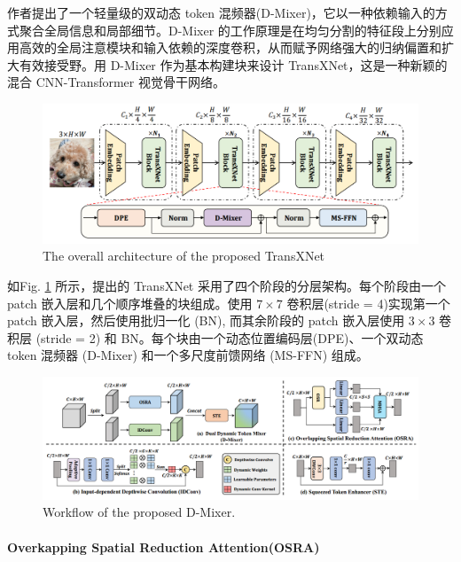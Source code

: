 \documentclass[a4paper]{ctexart}
\begin{document}
		作者提出了一个轻量级的双动态 token 混频器(D-Mixer)，它以一种依赖输入的方式聚合全局信息和局部细节。D-Mixer 的工作原理是在均匀分割的特征段上分别应用高效的全局注意模块和输入依赖的深度卷积，从而赋予网络强大的归纳偏置和扩大有效接受野。用 D-Mixer 作为基本构建块来设计 TransXNet，这是一种新颖的混合 CNN-Transformer 视觉骨干网络。
		
		\begin{figure}[htbp]
			\centering
			\includegraphics[width=\linewidth]{picture/LLIE/Experiment/the Proposed TransXNet}
			\caption{The overall architecture of the proposed TransXNet}
			\label{fig: TransXNet}
		\end{figure}
		
		如Fig. \ref{fig: TransXNet} 所示，提出的 TransXNet 采用了四个阶段的分层架构。每个阶段由一个 patch 嵌入层和几个顺序堆叠的块组成。使用 $7 \times 7$ 卷积层(stride = 4)实现第一个 patch 嵌入层，然后使用批归一化 (BN), 而其余阶段的 patch 嵌入层使用 $3 \times 3$ 卷积层 (stride = 2) 和 BN。每个块由一个动态位置编码层(DPE)、一个双动态 token 混频器 (D-Mixer) 和一个多尺度前馈网络 (MS-FFN) 组成。
		
		\begin{figure}[htbp]
			\centering
			\includegraphics[width=\linewidth]{picture/LLIE/Experiment/D-Mixer}
			\caption{Workflow of the proposed D-Mixer.}
			\label{fig: D-Mixer}
		\end{figure}
		
		\paragraph{Overkapping Spatial Reduction Attention(OSRA)}
		
\end{document}
